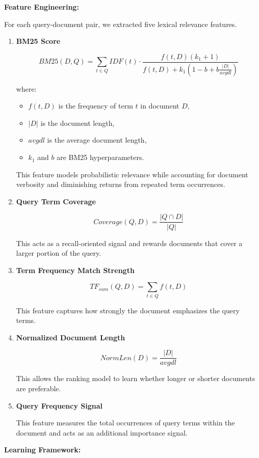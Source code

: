 \documentclass{article}
\begin{document}
\textbf{Feature Engineering:}

For each query-document pair, we extracted five lexical relevance features.

\begin{enumerate}
    \item \textbf{BM25 Score}

\[
BM25(D,Q)=\sum_{t\in Q} IDF(t)\cdot
\frac{f(t,D)(k_1+1)}
{f(t,D)+k_1\left(1-b+b\frac{|D|}{avgdl}\right)}
\]

where:
\begin{itemize}
    \item \(f(t,D)\) is the frequency of term \(t\) in document \(D\),
    \item \(|D|\) is the document length,
    \item \(avgdl\) is the average document length,
    \item \(k_1\) and \(b\) are BM25 hyperparameters.
\end{itemize}

This feature models probabilistic relevance while accounting for document verbosity and diminishing returns from repeated term occurrences.

    \item \textbf{Query Term Coverage}

\[
Coverage(Q,D)=\frac{|Q\cap D|}{|Q|}
\]

This acts as a recall-oriented signal and rewards documents that cover a larger portion of the query.

    \item \textbf{Term Frequency Match Strength}

\[
TF_{sum}(Q,D)=\sum_{t\in Q} f(t,D)
\]

This feature captures how strongly the document emphasizes the query terms.

    \item \textbf{Normalized Document Length}

\[
NormLen(D)=\frac{|D|}{avgdl}
\]

This allows the ranking model to learn whether longer or shorter documents are preferable.

    \item \textbf{Query Frequency Signal}

This feature measures the total occurrences of query terms within the document and acts as an additional importance signal.
\end{enumerate}

\textbf{Learning Framework:}
\end{document}
